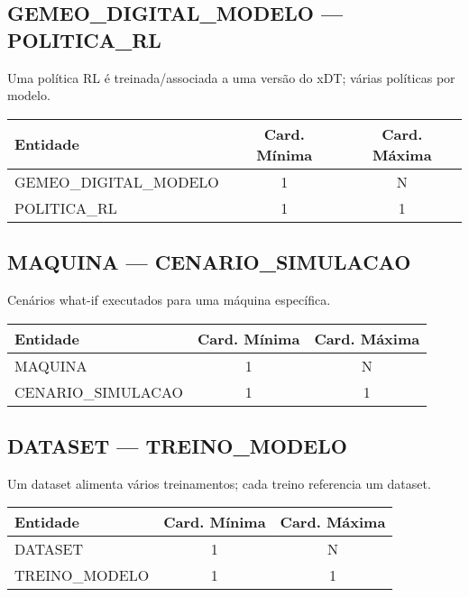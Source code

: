 \documentclass[10pt,a4paper]{article}
\begin{document}
\subsection*{GEMEO\_DIGITAL\_MODELO — POLITICA\_RL}
Uma política RL é treinada/associada a uma versão do xDT; várias políticas por modelo.
\begin{center}
\begin{tabular}{|l|c|c|}
\hline
\rowcolor{vermelhoheader}\color{white}\textbf{Entidade} & \textbf{Card. Mínima} & \textbf{Card. Máxima} \\
\hline
GEMEO\_DIGITAL\_MODELO & 1 & N \\
POLITICA\_RL & 1 & 1 \\
\hline
\end{tabular}
\end{center}
\vspace{0.5cm}

\subsection*{MAQUINA — CENARIO\_SIMULACAO}
Cenários what-if executados para uma máquina específica.
\begin{center}
\begin{tabular}{|l|c|c|}
\hline
\rowcolor{vermelhoheader}\color{white}\textbf{Entidade} & \textbf{Card. Mínima} & \textbf{Card. Máxima} \\
\hline
MAQUINA & 1 & N \\
CENARIO\_SIMULACAO & 1 & 1 \\
\hline
\end{tabular}
\end{center}
\hfill
\subsection*{DATASET — TREINO\_MODELO}
Um dataset alimenta vários treinamentos; cada treino referencia um dataset.
\begin{center}
\begin{tabular}{|l|c|c|}
\hline
\rowcolor{vermelhoheader}\color{white}\textbf{Entidade} & \textbf{Card. Mínima} & \textbf{Card. Máxima} \\
\hline
DATASET & 1 & N \\
TREINO\_MODELO & 1 & 1 \\
\hline
\end{tabular}
\end{center}
\end{document}
